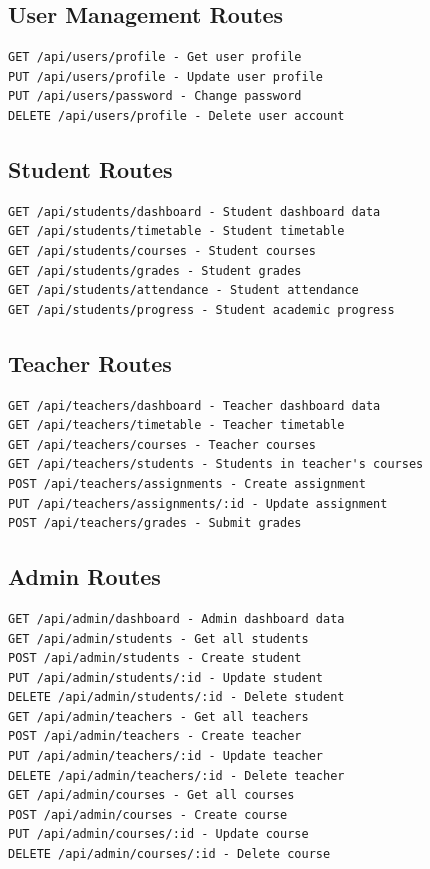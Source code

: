 \subsection{User Management Routes}

\begin{verbatim}
GET /api/users/profile - Get user profile
PUT /api/users/profile - Update user profile
PUT /api/users/password - Change password
DELETE /api/users/profile - Delete user account
\end{verbatim}

\subsection{Student Routes}

\begin{verbatim}
GET /api/students/dashboard - Student dashboard data
GET /api/students/timetable - Student timetable
GET /api/students/courses - Student courses
GET /api/students/grades - Student grades
GET /api/students/attendance - Student attendance
GET /api/students/progress - Student academic progress
\end{verbatim}

\subsection{Teacher Routes}

\begin{verbatim}
GET /api/teachers/dashboard - Teacher dashboard data
GET /api/teachers/timetable - Teacher timetable
GET /api/teachers/courses - Teacher courses
GET /api/teachers/students - Students in teacher's courses
POST /api/teachers/assignments - Create assignment
PUT /api/teachers/assignments/:id - Update assignment
POST /api/teachers/grades - Submit grades
\end{verbatim}

\subsection{Admin Routes}

\begin{verbatim}
GET /api/admin/dashboard - Admin dashboard data
GET /api/admin/students - Get all students
POST /api/admin/students - Create student
PUT /api/admin/students/:id - Update student
DELETE /api/admin/students/:id - Delete student
GET /api/admin/teachers - Get all teachers
POST /api/admin/teachers - Create teacher
PUT /api/admin/teachers/:id - Update teacher
DELETE /api/admin/teachers/:id - Delete teacher
GET /api/admin/courses - Get all courses
POST /api/admin/courses - Create course
PUT /api/admin/courses/:id - Update course
DELETE /api/admin/courses/:id - Delete course
\end{verbatim}


